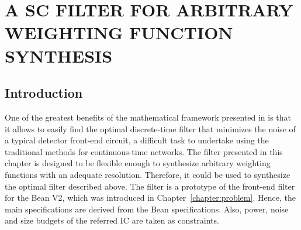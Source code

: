\chapter{A SC FILTER FOR ARBITRARY WEIGHTING FUNCTION SYNTHESIS}
\label{chapter:filter}
\section{Introduction}



One of the greatest benefits of the mathematical framework presented in \citep{avila101} is that it allows to easily find the optimal discrete-time filter that minimizes the noise of a typical detector front-end circuit, a difficult task to undertake using the traditional methods for continuous-time networks. The filter presented in this chapter is designed to be flexible enough to synthesize arbitrary weighting functions with an adequate resolution. Therefore, it could be used to synthesize the optimal filter described above. The filter is a prototype of the front-end filter for the Bean V2, which was introduced in Chapter~\ref{chapter:problem}. Hence, the main specifications are derived from the Bean specifications. Also, power, noise and size budgets of the referred IC are taken as constraints.

